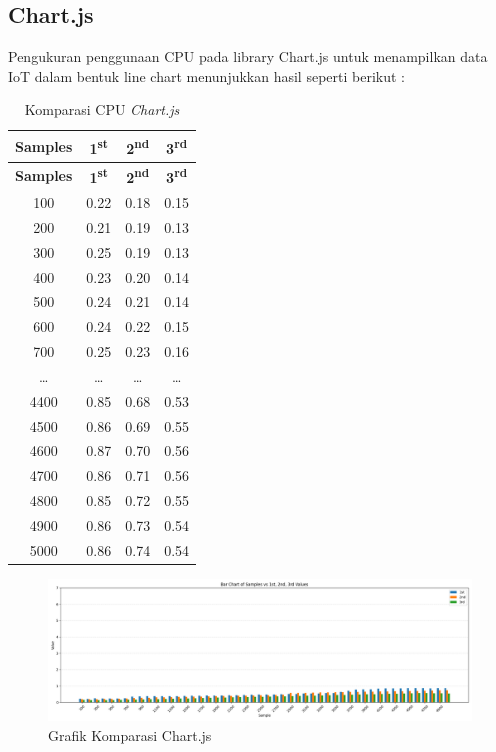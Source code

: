 \subsection{Chart.js}
Pengukuran penggunaan CPU pada library Chart.js untuk menampilkan data IoT dalam bentuk line chart menunjukkan hasil seperti berikut : 
\begin{longtable}{|c|c|c|c|}
	\caption{Komparasi CPU \textit{Chart.js}} \\
	\hline
	\textbf{Samples} & \textbf{1\textsuperscript{st}} & \textbf{2\textsuperscript{nd}} & \textbf{3\textsuperscript{rd}} \\
	\hline
	\endfirsthead
	\hline
	\textbf{Samples} & \textbf{1\textsuperscript{st}} & \textbf{2\textsuperscript{nd}} & \textbf{3\textsuperscript{rd}} \\
	\hline
	\endhead
	100  & 0.22 & 0.18 & 0.15 \\
	200  & 0.21 & 0.19 & 0.13 \\
	300  & 0.25 & 0.19 & 0.13 \\
	400  & 0.23 & 0.20 & 0.14 \\
	500  & 0.24 & 0.21 & 0.14 \\
	600  & 0.24 & 0.22 & 0.15 \\
	700  & 0.25 & 0.23 & 0.16 \\
	\ldots & \ldots & \ldots & \ldots \\
	4400 & 0.85 & 0.68 & 0.53 \\
	4500 & 0.86 & 0.69 & 0.55 \\
	4600 & 0.87 & 0.70 & 0.56 \\
	4700 & 0.86 & 0.71 & 0.56 \\
	4800 & 0.85 & 0.72 & 0.55 \\
	4900 & 0.86 & 0.73 & 0.54 \\
	5000 & 0.86 & 0.74 & 0.54 \\
	\hline
\end{longtable}

	\begin{figure}[H]
	\centering
	\includegraphics[width=0.8\linewidth]{gambar/Pembahasan/FIX_CPU/cjs compare.png}
	\caption{Grafik Komparasi Chart.js}
	\label{Grafik Komparasi Chart.js}
\end{figure}

